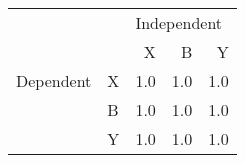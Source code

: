 \begin{tabular}{llrrr}
\toprule
          &   & \multicolumn{3}{l}{Independent} \\
          &   &           X &    B &    Y \\
\midrule
Dependent & X &         1.0 &  1.0 &  1.0 \\
          & B &         1.0 &  1.0 &  1.0 \\
          & Y &         1.0 &  1.0 &  1.0 \\
\bottomrule
\end{tabular}
